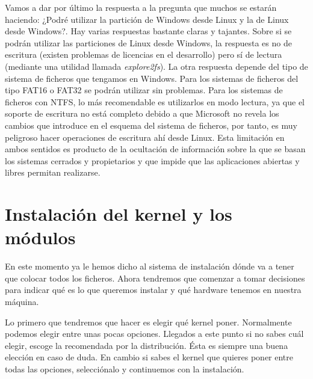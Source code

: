 Vamos  a dar  por último  la  respuesta a  la pregunta  que muchos  se
estarán haciendo: ¿Podré utilizar la  partición de Windows desde Linux
y la de Linux desde Windows?.  Hay varias respuestas bastante claras y
tajantes. Sobre si  se podrán utilizar las particiones  de Linux desde
Windows,  la  respuesta  es  no de  escritura  (existen  problemas  de
licencias en el desarrollo) pero  sí de lectura (mediante una utilidad
llamada  {\em explore2fs}).  La  otra respuesta  depende  del tipo  de
sistema  de ficheros  que tengamos  en Windows.  Para los  sistemas de
ficheros del tipo FAT16 o FAT32 se podrán utilizar sin problemas. Para
los sistemas de ficheros con  NTFS, lo más recomendable es utilizarlos
en modo lectura, ya que el soporte de escritura no está completo debido
a que Microsoft no revela los cambios que introduce en el esquema del sistema
de ficheros, por
tanto,  es muy  peligroso  hacer operaciones  de  escritura ahí  desde
Linux. Esta limitación en ambos  sentidos es producto de la ocultación
de  información  sobre  la  que  se  basan  los  sistemas  cerrados  y
propietarios  y que  impide  que las  aplicaciones  abiertas y  libres
permitan realizarse.


\section{Instalación del kernel y los módulos}

En este momento ya le hemos dicho al sistema de instalación dónde va a
tener que colocar  todos los ficheros. Ahora tendremos  que comenzar a
tomar decisiones  para indicar qué es  lo que queremos instalar  y qué
hardware tenemos en nuestra máquina.

Lo  primero  que tendremos  que  hacer  es  elegir qué  kernel  poner.
Normalmente  podemos  elegir entre  unas  pocas  opciones. Llegados  a
este  punto si  no sabes  cuál elegir,  escoge la  recomendada por  la
distribución. Ésta es  siempre una buena elección en caso  de duda. En
cambio si sabes el kernel que  quieres poner entre todas las opciones,
selecciónalo y continuemos con la instalación.


